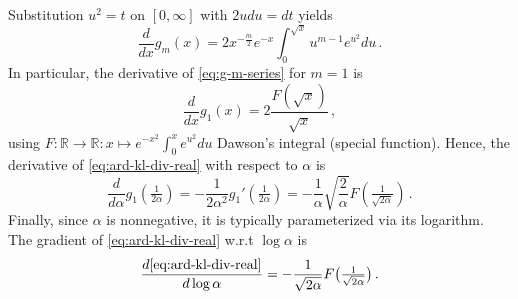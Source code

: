 \documentclass[a4paper,10pt]{article}
\begin{document}
Substitution $u^2 = t$ on $[0, \infty]$ with $2u du = dt$ yields
\begin{equation}  \label{eq:g-m-deriv-int-3}
  \frac{d}{d x} g_m(x)
    = 2 x^{-\tfrac{m}2} e^{-x}
        \int_0^{\sqrt{x}} u^{m - 1} e^{u^2} du
    \,.
\end{equation}
In particular, the derivative of \eqref{eq:g-m-series} for $m=1$ is
\begin{equation}  \label{eq:g-m-deriv-one}
  \frac{d}{d x} g_1(x)
    = 2 \frac{F(\sqrt{x})}{\sqrt{x}}
    \,,
\end{equation}
using $
  F \colon \mathbb{R} \to \mathbb{R}
  \colon x \mapsto e^{-x^2} \int_0^x e^{u^2} du
$ Dawson's integral (special function).
%
Hence, the derivative of \eqref{eq:ard-kl-div-real} with respect to $\alpha$ is
$$
\frac{d}{d \alpha} g_1(\tfrac1{2\alpha})
  = -\frac1{2 \alpha^2} g_1'(\tfrac1{2\alpha})
  = -\frac1{\alpha} \sqrt{\frac2{\alpha}} F(\tfrac1{\sqrt{2\alpha}})
  \,. $$
Finally, since $\alpha$ is nonnegative, it is typically parameterized via its logarithm.
The gradient of \eqref{eq:ard-kl-div-real} w.r.t $\log \alpha$ is
\begin{equation}  \label{eq:real-kl-div-deriv-log}
  \frac{d \eqref{eq:ard-kl-div-real}}{d\log \alpha}
    = - \frac1{\sqrt{2\alpha}} F\bigl(\tfrac1{\sqrt{2\alpha}}\bigr)
    \,.
\end{equation}
\end{document}
